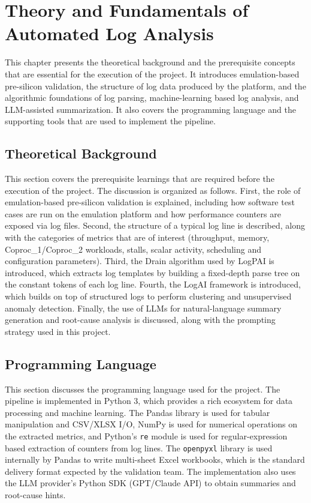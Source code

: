 \chapter{Theory and Fundamentals of Automated Log Analysis}

This chapter presents the theoretical background and the prerequisite concepts that are essential for the execution of the project. It introduces emulation-based pre-silicon validation, the structure of log data produced by the platform, and the algorithmic foundations of log parsing, machine-learning based log analysis, and LLM-assisted summarization. It also covers the programming language and the supporting tools that are used to implement the pipeline.

\section{Theoretical Background}

This section covers the prerequisite learnings that are required before the execution of the project. The discussion is organized as follows. First, the role of emulation-based pre-silicon validation is explained, including how software test cases are run on the emulation platform and how performance counters are exposed via log files. Second, the structure of a typical log line is described, along with the categories of metrics that are of interest (throughput, memory, Coproc\_1/Coproc\_2 workloads, stalls, scalar activity, scheduling and configuration parameters). Third, the Drain algorithm used by LogPAI is introduced, which extracts log templates by building a fixed-depth parse tree on the constant tokens of each log line. Fourth, the LogAI framework is introduced, which builds on top of structured logs to perform clustering and unsupervised anomaly detection. Finally, the use of LLMs for natural-language summary generation and root-cause analysis is discussed, along with the prompting strategy used in this project.

\section{Programming Language}
This section discusses the programming language used for the project. The pipeline is implemented in Python 3, which provides a rich ecosystem for data processing and machine learning. The Pandas library is used for tabular manipulation and CSV/XLSX I/O, NumPy is used for numerical operations on the extracted metrics, and Python's \texttt{re} module is used for regular-expression based extraction of counters from log lines. The \texttt{openpyxl} library is used internally by Pandas to write multi-sheet Excel workbooks, which is the standard delivery format expected by the validation team. The implementation also uses the LLM provider's Python SDK (GPT/Claude API) to obtain summaries and root-cause hints.

